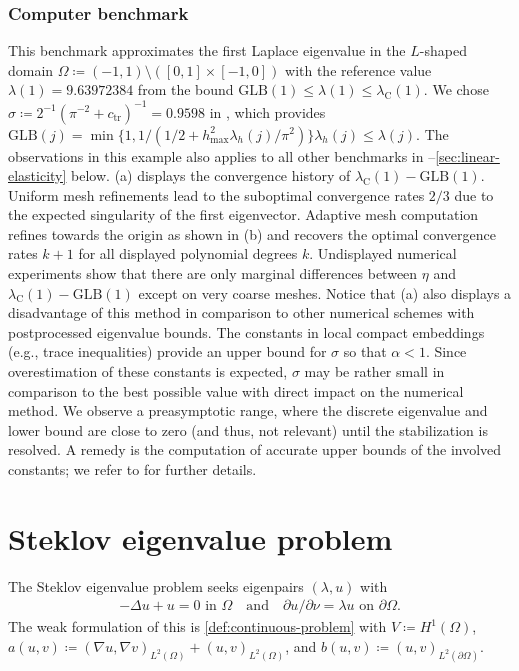 \documentclass[a4paper]{amsart}
\numberwithin{equation}{section}
\theoremstyle{remark}
\theoremstyle{definition}
\theoremstyle{assumptionnoperiod}
\begin{document}
\subsubsection{Computer benchmark}\label{sec:num_ex_laplace}
This benchmark approximates the first Laplace eigenvalue in the $L$-shaped domain $\Omega \coloneqq (-1,1) \setminus ([0,1] \times [-1,0])$ with the reference value $\lambda(1) = 9.63972384$ from the bound $\mathrm{GLB}(1) \leq \lambda(1) \leq \lambda_\mathrm{C}(1)$.
We chose $\sigma \coloneqq 2^{-1}(\pi^{-2} + c_\mathrm{tr})^{-1} = 0.9598$ in , which provides $\mathrm{GLB}(j) = \min\{1, 1/(1/2 + h_\mathrm{max}^2 \lambda_h(j)/\pi^2)\}\lambda_h(j) \leq \lambda(j)$.
The observations in this example also applies to all other benchmarks in --\ref{sec:linear-elasticity} below.
(a) displays the convergence history of $\lambda_\mathrm{C}(1) - \mathrm{GLB}(1)$.
Uniform mesh refinements lead to the suboptimal convergence rates $2/3$ due to the expected singularity of the first eigenvector. Adaptive mesh computation refines towards the origin as shown in (b) and recovers the optimal convergence rates $k+1$ for all displayed polynomial degrees $k$.
Undisplayed numerical experiments show that there are only marginal differences between $\eta$ and $\lambda_\mathrm{C}(1) - \mathrm{GLB}(1)$ except on very coarse meshes. 
Notice that (a) also displays a disadvantage of this method in comparison to other numerical schemes \cite{LiuOishi2013,CarstensenGedicke2014,Gallistl2023} with postprocessed eigenvalue bounds.
The constants in local compact embeddings (e.g., trace inequalities) provide an upper bound for $\sigma$ so that $\alpha < 1$. Since overestimation of these constants is expected, $\sigma$ may be rather small in comparison to the best possible value with direct impact on the numerical method. We observe a preasymptotic range, where the discrete eigenvalue and lower bound are close to zero (and thus, not relevant) until the stabilization is resolved.
A remedy is the computation of accurate upper bounds of the involved constants; we refer to  for further details.

\section{Steklov eigenvalue problem}\label{sec:steklov}
The Steklov eigenvalue problem seeks eigenpairs $(\lambda, u)$ with
\begin{align*}
	- \Delta u + u = 0 \text{ in } \Omega \quad\text{and}\quad \partial u/\partial \nu = \lambda u \text{ on } \partial \Omega. 
\end{align*}
The weak formulation of this is \eqref{def:continuous-problem} with $V \coloneqq H^1(\Omega)$, $a(u,v) \coloneqq (\nabla u, \nabla v)_{L^2(\Omega)} + (u, v)_{L^2(\Omega)}$, and $b(u,v) \coloneqq (u, v)_{L^2(\partial \Omega)}$.
\end{document}
